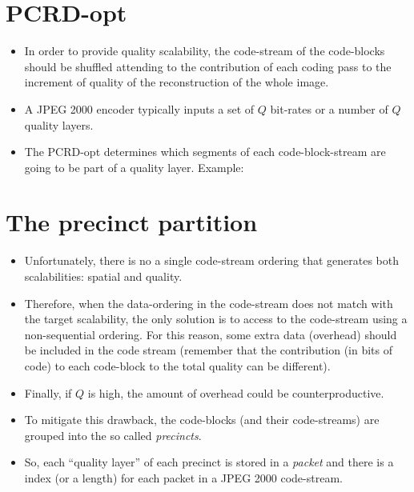 \section*{PCRD-opt}
\begin{itemize}
\item In order to provide quality scalability, the code-stream of the
  code-blocks should be shuffled attending to the contribution of each
  coding pass to the increment of quality of the reconstruction of the
  whole image.
\item A JPEG 2000 encoder typically inputs a set of $Q$ bit-rates or a
  number of $Q$ quality layers.
\item The PCRD-opt determines which segments of each code-block-stream
  are going to be part of a quality layer. Example:
\end{itemize}
\begin{center}
\end{center}

\section*{The precinct partition}
\begin{itemize}
\item Unfortunately, there is no a single code-stream ordering that
  generates both scalabilities: spatial and quality.
\item Therefore, when the data-ordering in the code-stream does not
  match with the target scalability, the only solution is to access to
  the code-stream using a non-sequential ordering. For this reason,
  some extra data (overhead) should be included in the code stream
  (remember that the contribution (in bits of code) to each code-block
  to the total quality can be different).
\item Finally, if $Q$ is high, the amount of overhead could be
  counterproductive.
\item To mitigate this drawback, the code-blocks (and their
  code-streams) are grouped into the so called \emph{precincts}.
\item So, each ``quality layer'' of each precinct is stored in a
  \emph{packet} and there is a index (or a length) for each packet in
  a JPEG 2000 code-stream.
\end{itemize}
\begin{center}
\end{center}

